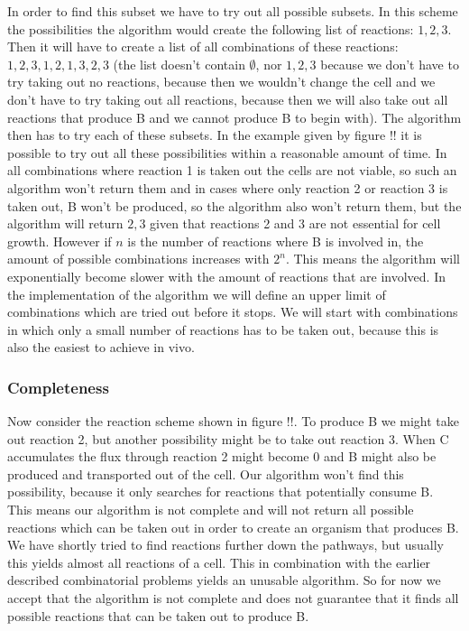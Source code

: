 \documentclass[10pt]{report}
\begin{document}
In order to find this subset we have to try out all possible subsets. In this scheme the possibilities the algorithm would create the following list of reactions: ${1, 2, 3}$.
Then it will have to create a list of all combinations of these reactions: ${{1},{2},{3},{1,2},{1,3},{2,3}}$ (the list doesn't contain $\emptyset$, nor ${1,2,3}$ because we don't have to try taking out no reactions, because then we wouldn't change the cell and we don't have to try taking out all reactions, because then we will also take out all reactions that produce B and we cannot produce B to begin with).
The algorithm then has to try each of these subsets.
In the example given by figure !! it is possible to try out all these possibilities within a reasonable amount of time.
In all combinations where reaction 1 is taken out the cells are not viable, so such an algorithm won't return them and in cases where only reaction 2 or reaction 3 is taken out, B won't be produced, so the algorithm also won't return them, but the algorithm will return ${2,3}$ given that reactions 2 and 3 are not essential for cell growth.
However if $n$ is the number of reactions where B is involved in, the amount of possible combinations increases with $2^n$.
This means the algorithm will exponentially become slower with the amount of reactions that are involved.
In the implementation of the algorithm we will define an upper limit of combinations which are tried out before it stops. We will start with combinations in which only a small number of reactions has to be taken out, because this is also the easiest to achieve in vivo.

\subsubsection{Completeness}
Now consider the reaction scheme shown in figure !!.
To produce B we might take out reaction 2, but another possibility might be to take out reaction 3.
When C accumulates the flux through reaction 2 might become 0 and B might also be produced and transported out of the cell.
Our algorithm won't find this possibility, because it only searches for reactions that potentially consume B.
This means our algorithm is not complete and will not return all possible reactions which can be taken out in order to create an organism that produces B.
We have shortly tried to find reactions further down the pathways, but usually this yields almost all reactions of a cell.
This in combination with the earlier described combinatorial problems yields an unusable algorithm.
So for now we accept that the algorithm is not complete and does not guarantee that it finds all possible reactions that can be taken out to produce B.
\end{document}
